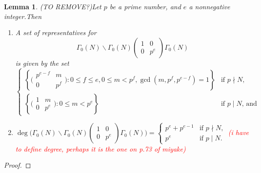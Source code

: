 \documentclass[10pt,leqno,twoside]{article}
\theoremstyle{plain}
\newtheorem{lemma}[lem]{Lemma}
\theoremstyle{definition}
\numberwithin{equation}{section}
\numberwithin{lem}{section}
\newcommand{\cbr}[1]{\left\{#1\right\}}
\newcommand{\textib}[1]{\textbf{\textit{#1\index{#1}}}} %
\newcommand{\tbd}{{\Huge\color{red}{\textib{TO DO}}}}
\newcommand{\sai}[1]{\textcolor{red}{#1}}
\begin{document}
\begin{lemma}\label{lem: miyake lem 4.5.6}
    (TO REMOVE?)Let $p$ be a prime number, and $e$ a nonnegative integer.Then \begin{enumerate}[label=\textup{(\arabic*)}]
        \item A set of representatives for \[\varGamma_0(N)\backslash\varGamma_0(N)\begin{pmatrix}
            1 & 0 \\ 0 & p^e
        \end{pmatrix}\varGamma_0(N)\] is given by the set \[\begin{cases}
            \cbr{\big(\!\begin{smallmatrix}
                p^{e-f} & m \\ 0 & p^f
            \end{smallmatrix}\!\big) : 0\leq f\leq e, 0\leq m < p^f, \gcd(m,p^f,p^{e-f}) = 1} & \text{if $p\nmid N$},\\
            \cbr{\big(\!\begin{smallmatrix}
                1 & m \\ 0 & p^e
            \end{smallmatrix}\!\big) : 0\leq m < p^e} & \text{if $p\mid N$, and}
        \end{cases} \]
        \item $\deg\Big(\varGamma_0(N)\backslash\varGamma_0(N)\begin{pmatrix}
            1 & 0 \\ 0 & p^e
        \end{pmatrix}\varGamma_0(N)\Big) = \begin{cases}
            p^e + p^{e-1} & \text{if $p\nmid N$,}\\
            p^e & \text{if $p\mid N$.}
        \end{cases}$ \sai{(i have to define degree, perhaps it is the one on p.73 of miyake)}
    \end{enumerate}
\end{lemma}
\begin{proof}
    \tbd
\end{proof}
\end{document}
